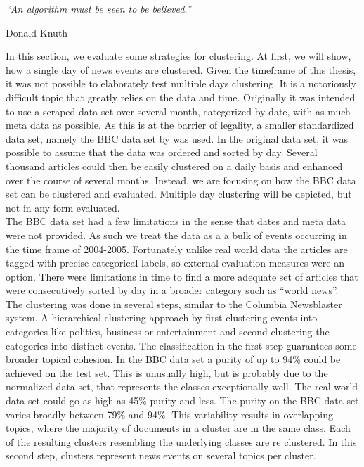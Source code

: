 \epigraph{\emph{
  ``An algorithm must be seen to be believed.''
}}{ Donald Knuth }

In this section, we evaluate some strategies for clustering. At first, we will show, how a single day of news events are clustered. Given the timeframe of this thesis, it was not possible to elaborately test multiple days clustering. It is a notoriously difficult topic that greatly relies on the data and time. Originally it was intended to use a scraped data set over several month, categorized by date, with as much meta data as possible. As this is at the barrier of legality, a smaller standardized data set, namely the BBC data set by \cite{BBCData2006} was used. In the original data set, it was possible to assume that the data was ordered and sorted by day. Several thousand articles could then be easily clustered on a daily basis and enhanced over the course of several months. Instead, we are focusing on how the BBC data set can be clustered and evaluated. Multiple day clustering will be depicted, but not in any form evaluated.\\

The BBC data set had a few limitations in the sense that dates and meta data were not provided. As such we treat the data as a a bulk of events occurring in the time frame of 2004-2005. Fortunately unlike real world data the articles are tagged with precise categorical labels, so external evaluation measures were an option. There were limitations in time to find a more adequate set of articles that were consecutively sorted by day in a broader category such as ``world news''.\\

The clustering was done in several steps, similar to the Columbia Newsblaster system.\cite{NewsBlaster2002} A hierarchical clustering approach by first clustering events into categories like politics, business or entertainment and second clustering the categories into distinct events. The classification in the first step guarantees some broader topical cohesion. In the BBC data set a purity of up to 94\% could be achieved on the test set. This is unusually high, but is probably due to the normalized data set, that represents the classes exceptionally well. The real world data set could go as high as 45\% purity and less. The purity on the BBC data set varies broadly between 79\% and 94\%. This variability results in overlapping topics, where the majority of documents in a cluster are in the same class. Each of the resulting clusters resembling the underlying classes are re clustered. In this second step, clusters represent news events on several topics per cluster.\\

